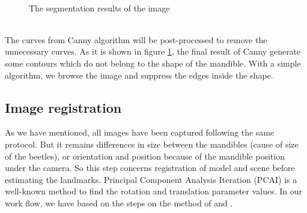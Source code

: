 \documentclass[twoside,twocolumn,10pt]{article}
\begin{document}
\begin{figure}[h]
\centering
{}~~ 
\caption{The segmentation results of the image}
\label{canny}
\end{figure}~\\
The curves from
Canny algorithm will be post-processed to remove the unnecessary
curves. As it is shown in figure \ref{canny}, the final result of Canny generate some contours which do not belong to the shape of the mandible. With a simple algorithm, we browse the image and suppress the edges inside the shape.
\subsection{Image registration}
As we have mentioned, all images have been captured following the same protocol. But it remains differences in size between the mandibles (cause of size of the beetles), or orientation and position because of the mandible position under the camera. So this step concerns registration of model and scene before estimating the landmarks. Principal Component Analysis Iteration (PCAI) is a well-known method to find the rotation and translation parameter values. In our work flow, we have based on the steps on the method of \cite{bsspca} and  \cite{shlens2014tutorial}.\\
\end{document}
